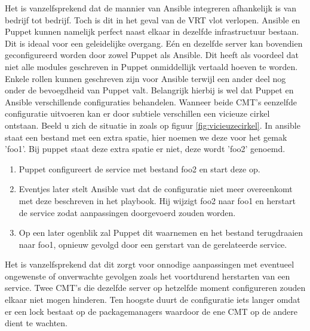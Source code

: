 Het is vanzelfsprekend dat de mannier van Ansible integreren afhankelijk is van bedrijf tot bedrijf. Toch is dit in het geval van de VRT vlot verlopen. Ansible en Puppet kunnen namelijk perfect naast elkaar in dezelfde infrastructuur bestaan. Dit is ideaal voor een geleidelijke overgang. E\'en en dezelfde server kan bovendien geconfigureerd worden door zowel Puppet als Ansible. Dit heeft als voordeel dat niet alle modules geschreven in Puppet onmiddellijk vertaald hoeven te worden. Enkele rollen kunnen geschreven zijn voor Ansible terwijl een ander deel nog onder de bevoegdheid van Puppet valt. Belangrijk hierbij is wel dat Puppet en Ansible verschillende configuraties behandelen. Wanneer beide \gls{CMT}'s eenzelfde configuratie uitvoeren kan er door subtiele verschillen een vicieuze cirkel ontstaan.\newline
Beeld u zich de situatie in zoals op figuur \ref{fig:vicieuzecirkel}. In ansible staat een bestand met een extra spatie, hier noemen we deze voor het gemak 'foo1'. Bij puppet staat deze extra spatie er niet, deze wordt 'foo2' genoemd. 
\begin{enumerate}
\item Puppet configureert de service met bestand foo2 en start deze op.
\item  Eventjes later stelt Ansible vast dat de configuratie niet meer overeenkomt met deze beschreven in het playbook. Hij wijzigt foo2 naar foo1 en herstart de service zodat aanpassingen doorgevoerd zouden worden.
\item  Op een later ogenblik zal Puppet dit waarnemen en het bestand terugdraaien naar foo1, opnieuw gevolgd door een gerstart van de gerelateerde service.
\end{enumerate}
Het is vanzelfsprekend dat dit zorgt voor onnodige aanpassingen met eventueel ongewenste of onverwachte gevolgen zoals het voortdurend herstarten van een service.\newline
Twee \gls{CMT}'s die dezelfde server op hetzelfde moment configureren zouden elkaar niet mogen hinderen. Ten hoogste duurt de configuratie iets langer omdat er een lock bestaat op de \gls{packagemanager}s waardoor de ene \gls{CMT} op de andere dient te wachten.



